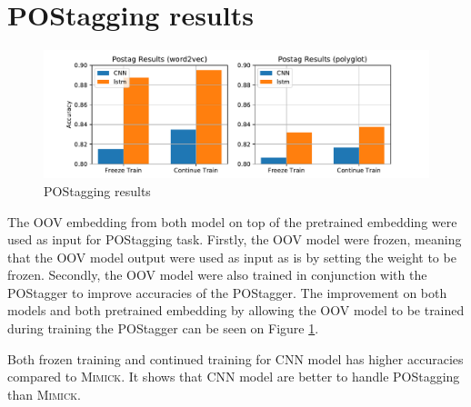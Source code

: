     \section{POStagging results}
      \begin{figure}[H]
        \centering
        \includegraphics[width=\linewidth]{images/postag_results.pdf}
        \caption{POStagging results}
        \label{fig:postag_results}
      \end{figure}
      The OOV embedding from both model on top of the pretrained
      embedding were used as input for POStagging task. Firstly, the
      OOV model were frozen, meaning that the OOV model output were
      used as input as is by setting the weight to be frozen.
      Secondly, the OOV model were also trained in conjunction with
      the POStagger to improve accuracies of the POStagger. The
      improvement on both models and both pretrained embedding by
      allowing the OOV model to be trained during training the
      POStagger can be seen on Figure \ref{fig:postag_results}.

      Both frozen training and continued training for CNN model has
      higher accuracies compared to \textsc{Mimick}. It shows that CNN
      model are better to handle POStagging than \textsc{Mimick}.

